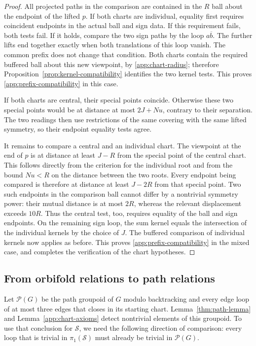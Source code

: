 \documentclass[11pt,reqno]{amsart}
\numberwithin{equation}{section}
\theoremstyle{definition}
\theoremstyle{remark}
\begin{document}
\begin{proof}
All projected paths in the comparison are contained in the $R$ ball
about the endpoint of the lifted $p$.  If both charts are individual,
equality first requires coincident endpoints in the actual ball and
sign data.  If this requirement fails, both tests fail.  If it holds,
compare the two sign paths by the loop $a\overline b$.  The further
lifts end together exactly when both translations of this loop
vanish.  The common prefix does not change that condition.  Both
charts contain the required buffered ball about this new viewpoint,
by \eqref{app:chart-radius}; therefore
Proposition~\ref{prop:kernel-compatibility} identifies the two kernel
tests.  This proves \eqref{app:prefix-compatibility} in this case.

If both charts are central, their special points coincide.  Otherwise
these two special points would be at distance at most $2J+Nu$,
contrary to their separation.  The two readings then use restrictions
of the same covering with the same lifted symmetry, so their endpoint
equality tests agree.

It remains to compare a central and an individual chart.  The
viewpoint at the end of $p$ is at distance at least $J-R$ from the
special point of the central chart.  This follows directly from the
criterion for the individual root and from the bound $Nu<R$ on the
distance between the two roots.  Every endpoint being compared is
therefore at distance at least $J-2R$ from that special point.  Two
such endpoints in the comparison ball cannot differ by a nontrivial
symmetry power: their mutual distance is at most $2R$, whereas the
relevant displacement exceeds $10R$.  Thus the central test, too,
requires equality of the ball and sign endpoints.  On the remaining
sign loop, the sum kernel equals the intersection of the individual
kernels by the choice of $J$.  The buffered comparison of individual
kernels now applies as before.  This proves
\eqref{app:prefix-compatibility} in the mixed case, and completes the
verification of the chart hypotheses.
\end{proof}

\subsection{From orbifold relations to path relations}

Let $\mathcal P(G)$ be the path groupoid of $G$ modulo backtracking
and every edge loop of at most three edges that closes in its starting
chart.  Lemma~\ref{thm:path-lemma} and
Lemma~\ref{app:chart-axioms} detect nontrivial elements of this
groupoid.  To use that conclusion for $\mathcal S$, we need the following
direction of comparison: every loop that is trivial in
$\pi_1(\mathcal S)$ must already be trivial in $\mathcal P(G)$.
\end{document}

